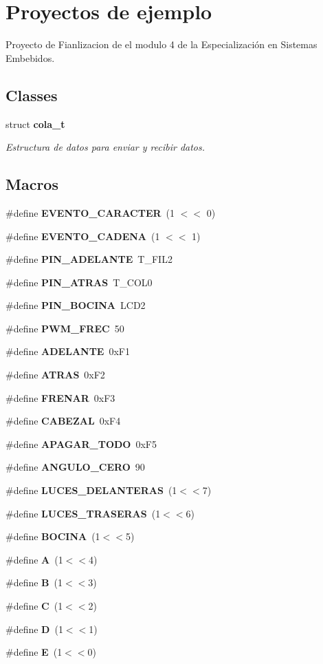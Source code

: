 \section{Proyectos de ejemplo}
\label{group__ejemplos}


Proyecto de Fianlizacion de el modulo 4 de la Especialización en Sistemas Embebidos.  


\subsection*{Classes}
\begin{DoxyCompactItemize}
\item 
struct \textbf{ cola\+\_\+t}
\begin{DoxyCompactList}\small\item\em Estructura de datos para enviar y recibir datos. \end{DoxyCompactList}\end{DoxyCompactItemize}
\subsection*{Macros}
\begin{DoxyCompactItemize}
\item 
\#define \textbf{ E\+V\+E\+N\+T\+O\+\_\+\+C\+A\+R\+A\+C\+T\+ER}~(1 $<$$<$ 0)
\item 
\#define \textbf{ E\+V\+E\+N\+T\+O\+\_\+\+C\+A\+D\+E\+NA}~(1 $<$$<$ 1)
\item 
\#define \textbf{ P\+I\+N\+\_\+\+A\+D\+E\+L\+A\+N\+TE}~T\+\_\+\+F\+I\+L2
\item 
\#define \textbf{ P\+I\+N\+\_\+\+A\+T\+R\+AS}~T\+\_\+\+C\+O\+L0
\item 
\#define \textbf{ P\+I\+N\+\_\+\+B\+O\+C\+I\+NA}~L\+C\+D2
\item 
\#define \textbf{ P\+W\+M\+\_\+\+F\+R\+EC}~50
\item 
\#define \textbf{ A\+D\+E\+L\+A\+N\+TE}~0x\+F1
\item 
\#define \textbf{ A\+T\+R\+AS}~0x\+F2
\item 
\#define \textbf{ F\+R\+E\+N\+AR}~0x\+F3
\item 
\#define \textbf{ C\+A\+B\+E\+Z\+AL}~0x\+F4
\item 
\#define \textbf{ A\+P\+A\+G\+A\+R\+\_\+\+T\+O\+DO}~0x\+F5
\item 
\#define \textbf{ A\+N\+G\+U\+L\+O\+\_\+\+C\+E\+RO}~90
\item 
\#define \textbf{ L\+U\+C\+E\+S\+\_\+\+D\+E\+L\+A\+N\+T\+E\+R\+AS}~(1$<$$<$7)
\item 
\#define \textbf{ L\+U\+C\+E\+S\+\_\+\+T\+R\+A\+S\+E\+R\+AS}~(1$<$$<$6)
\item 
\#define \textbf{ B\+O\+C\+I\+NA}~(1$<$$<$5)
\item 
\#define \textbf{ A}~(1$<$$<$4)
\item 
\#define \textbf{ B}~(1$<$$<$3)
\item 
\#define \textbf{ C}~(1$<$$<$2)
\item 
\#define \textbf{ D}~(1$<$$<$1)
\item 
\#define \textbf{ E}~(1$<$$<$0)
\end{DoxyCompactItemize}
